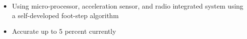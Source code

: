 \documentclass[10pt,a4paper,ragged2e,withhyper]{altacv}
\begin{document}
\begin{paracol}{2}
            \begin{itemize}
                \item Using micro-processor, acceleration sensor, and radio integrated system using a self-developed foot-step algorithm
                \item Accurate up to 5 percent currently
            \end{itemize}
            
    \end{paracol}
\end{document}
